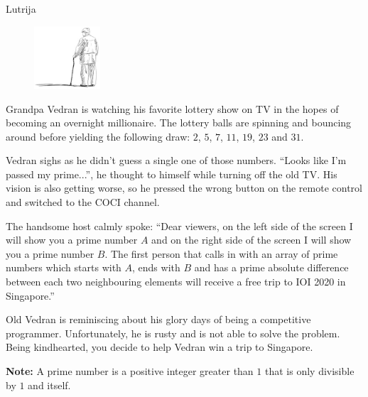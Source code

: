 \begin{statement}[
  problempoints=70,
  timelimit=1 second,
  memorylimit=512 MiB,
]{Lutrija}

\setlength\intextsep{-0.1cm}
\begin{figure}
\centering
\includegraphics[width=0.22\textwidth]{img/vedran_kurdija.png}
\end{figure}


Grandpa Vedran is watching his favorite lottery show on TV in the hopes of
becoming an overnight millionaire. The lottery balls are spinning and bouncing
around before yielding the following draw: $2$, $5$, $7$, $11$, $19$, $23$ and
$31$.

Vedran sighs as he didn't guess a single one of those numbers. ``Looks like
I'm passed my prime...'', he thought to himself while turning off the old
TV. His vision is also getting worse, so he pressed the wrong button on the
remote control and switched to the COCI channel.

The handsome host calmly spoke: ``Dear viewers, on the left side of the screen
I will show you a prime number $A$ and on the right side of the screen I will
show you a prime number $B$. The first person that calls in with an array of
prime numbers which starts with $A$, ends with $B$ and has a prime absolute
difference between each two neighbouring elements will receive a free trip
to IOI 2020 in Singapore.''


Old Vedran is reminiscing about his glory days of being a competitive programmer.
Unfortunately, he is rusty and is not able to solve the problem. Being
kindhearted, you decide to help Vedran win a trip to Singapore.

\textbf{Note:} A prime number is a positive integer greater than $1$ that is
only divisible by $1$ and itself.



\end{statement}

